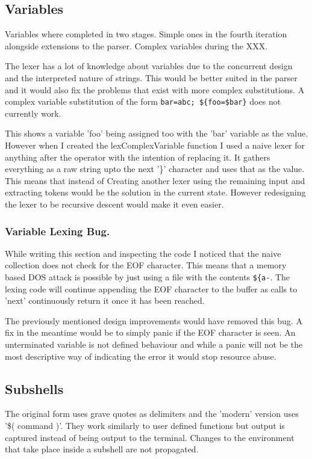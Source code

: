 \subsection{Variables}
Variables where completed in two stages.
Simple ones in the fourth iteration alongside extensions to the parser.
Complex variables during the XXX.

The lexer has a lot of knowledge about variables due to the concurrent design and the interpreted nature of strings.
This would be better suited in the parser and it would also fix the problems that exist with more complex substitutions.
A complex variable substitution of the form \verb!bar=abc; ${foo=$bar}! does not currently work.

This shows a variable 'foo' being assigned too with the 'bar' variable as the value.
However when I created the lexComplexVariable function I used a naive lexer for anything after the operator with the intention of replacing it.
It gathers everything as a raw string upto the next '\}' character and uses that as the value.
This means that instead of 
Creating another lexer using the remaining input and extracting tokens would be the solution in the current state.
However redesigning the lexer to be recursive descent would make it even easier.

\subsubsection{Variable Lexing Bug.}
While writing this section and inspecting the code I noticed that the naive collection does not check for the EOF character.
This means that a memory based DOS attack is possible by just using a file with the contents \verb!${a-!.
The lexing code will continue appending the EOF character to the buffer as calls to 'next' continuously return it once it has been reached.

The previously mentioned design improvements would have removed this bug.
A fix in the meantime would be to simply panic if the EOF character is seen.
An unterminated variable is not defined behaviour and while a panic will not be the most descriptive way of indicating the error it would stop resource abuse.

\subsection{Subshells}
The original form uses grave quotes as delimiters and the 'modern' version uses '\$( command )'.
They work similarly to user defined functions but output is captured instead of being output to the terminal.
Changes to the environment that take place inside a subshell are not propagated. 

